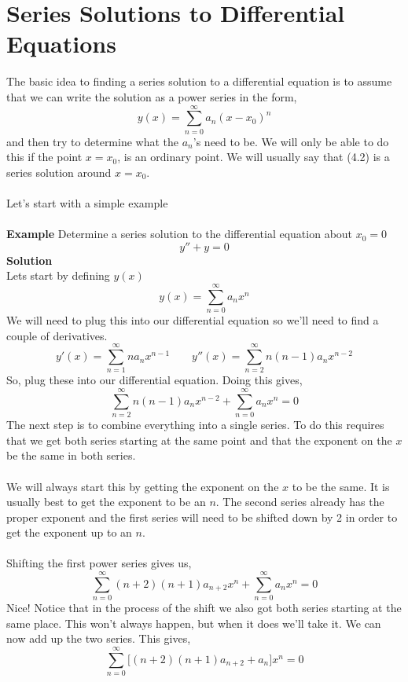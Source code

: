 \documentclass[10pt,reqno]{book}
\theoremstyle{definition}
\begin{document}
	\section{Series Solutions to Differential Equations}
	
	The basic idea to finding a series solution to a differential equation is to assume that we can write the solution as a power series in the form,
	\begin{equation}
	y(x) = \sum_{n=0}^{\infty} a_n (x-x_0)^n
	\end{equation}
	and then try to determine what the $ a_n $'s need to be. We will only be able to do this if the point $ x = x_0 $, is an ordinary point. We will usually say that (4.2) is a series solution around $ x = x_0 $.\\ \\
	Let's start with a simple example\\ \\
	\textbf{Example} Determine a series solution to the differential equation about $ x_0 = 0 $
	\[ y'' + y = 0 \]
	\textbf{Solution}\\
	Lets start by defining $ y(x) $
	\[ y(x) = \sum_{n=0}^{\infty} a_n x^n \]
	We will need to plug this into our differential equation so we'll need to find a couple of derivatives.
	\[ y'(x) = \sum_{n=1}^{\infty} n a_n x^{n-1} \qquad y''(x) = \sum_{n=2}^{\infty} n (n-1) a_n x^{n-2} \]
	So, plug these into our differential equation. Doing this gives, 
	\[ \sum_{n=2}^{\infty} n (n-1) a_n x^{n-2} + \sum_{n=0}^{\infty} a_n x^n = 0 \]
	The next step is to combine everything into a single series. To do this requires that we get both series starting at the same point and that the exponent on the $ x $ be the same in both series. \\ \\
	We will always start this by getting the exponent on the $ x $ to be the same. It is usually best to get the exponent to be an $ n $. The second series already has the proper exponent and the first series will need to be shifted down by 2 in order to get the exponent up to an $ n $.\\ \\
	Shifting the first power series gives us,
	\[ \sum_{n = 0}^{\infty} (n+2)(n+1)a_{n+2} x^n + \sum_{n = 0}^{\infty} a_n x^n = 0 \]
	Nice! Notice that in the process of the shift we also got both series starting at the same place. This won't always happen, but when it does we'll take it. We can now add up the two series. This gives,
	\[ \sum_{n=0}^{\infty} \big[(n+2)(n+1)a_{n+2} + a_n\big]x^n = 0 \]
\end{document}
